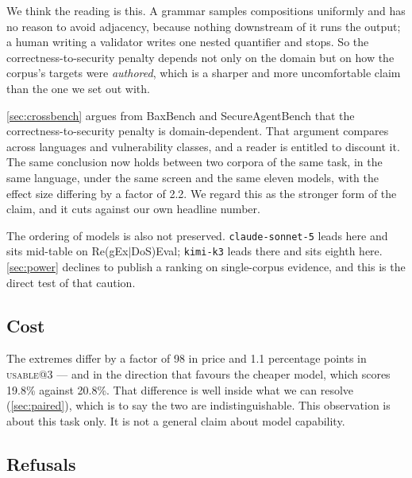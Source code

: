 \documentclass[11pt]{article}
\newcommand{\usable}{\textsc{usable}}
\begin{document}
We think the reading is this. A grammar samples compositions uniformly and has
no reason to avoid adjacency, because nothing downstream of it runs the
output; a human writing a validator writes one nested quantifier and stops.
So the correctness-to-security penalty depends not only on the domain but on
how the corpus's targets were \emph{authored}, which is a sharper and more
uncomfortable claim than the one we set out with.

\cref{sec:crossbench} argues from BaxBench and SecureAgentBench that the
correctness-to-security penalty is domain-dependent. That argument compares
across languages and vulnerability classes, and a reader is entitled to
discount it. The same conclusion now holds between two corpora of the same
task, in the same language, under the same screen and the same eleven
models, with the effect size differing by a factor of 2.2. We regard this as
the stronger form of the claim, and it cuts against our own headline number.

The ordering of models is also not preserved. \texttt{claude-sonnet-5} leads
here and sits mid-table on Re(gEx$|$DoS)Eval; \texttt{kimi-k3} leads there
and sits eighth here. \cref{sec:power} declines to publish a ranking on
single-corpus evidence, and this is the direct test of that caution.

\subsection{Cost}

\begin{table}[htbp]
\centering
\small

\caption{Cost per \emph{request}, measured from per-request billing returned
by the serving layer rather than estimated from list prices. A task costs
three of these at $n=3$: \texttt{claude-opus-5} at $2514.2 \times 10^{-6}$
over 1{,}350 requests gives the \$3.39 total.}
\label{tab:cost}
\end{table}

The extremes differ by a factor of 98 in price and 1.1 percentage points in
\usable{}@3 --- and in the direction that favours the cheaper model, which
scores 19.8\% against 20.8\%. That difference is well inside what we can
resolve (\cref{sec:paired}), which is to say the two are indistinguishable.
This observation is about this task only. It is not a general claim about
model capability.

\subsection{Refusals}
\end{document}
